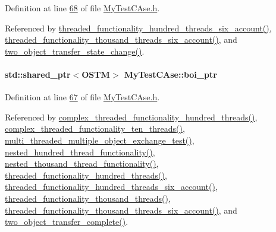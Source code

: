 Definition at line \hyperlink{_my_test_c_ase_8h_source_l00068}{68} of file \hyperlink{_my_test_c_ase_8h_source}{My\+Test\+C\+Ase.\+h}.



Referenced by \hyperlink{_my_test_c_ase_8cpp_source_l00589}{threaded\+\_\+functionality\+\_\+hundred\+\_\+threads\+\_\+six\+\_\+account()}, \hyperlink{_my_test_c_ase_8cpp_source_l00634}{threaded\+\_\+functionality\+\_\+thousand\+\_\+threads\+\_\+six\+\_\+account()}, and \hyperlink{_my_test_c_ase_8cpp_source_l00765}{two\+\_\+object\+\_\+transfer\+\_\+state\+\_\+change()}.

\paragraph[{\texorpdfstring{boi\+\_\+ptr}{boi_ptr}}]{\setlength{\rightskip}{0pt plus 5cm}std\+::shared\+\_\+ptr$<${\bf O\+S\+TM}$>$ My\+Test\+C\+Ase\+::boi\+\_\+ptr}\hypertarget{class_my_test_c_ase_a5554de9e3e6393a89c66c036c529720b_a5554de9e3e6393a89c66c036c529720b}{}\label{class_my_test_c_ase_a5554de9e3e6393a89c66c036c529720b_a5554de9e3e6393a89c66c036c529720b}


Definition at line \hyperlink{_my_test_c_ase_8h_source_l00067}{67} of file \hyperlink{_my_test_c_ase_8h_source}{My\+Test\+C\+Ase.\+h}.



Referenced by \hyperlink{_my_test_c_ase_8cpp_source_l00412}{complex\+\_\+threaded\+\_\+functionality\+\_\+hundred\+\_\+threads()}, \hyperlink{_my_test_c_ase_8cpp_source_l00467}{complex\+\_\+threaded\+\_\+functionality\+\_\+ten\+\_\+threads()}, \hyperlink{_my_test_c_ase_8cpp_source_l00922}{multi\+\_\+threaded\+\_\+multiple\+\_\+object\+\_\+exchange\+\_\+test()}, \hyperlink{_my_test_c_ase_8cpp_source_l00680}{nested\+\_\+hundred\+\_\+thread\+\_\+functionality()}, \hyperlink{_my_test_c_ase_8cpp_source_l00715}{nested\+\_\+thousand\+\_\+thread\+\_\+functionality()}, \hyperlink{_my_test_c_ase_8cpp_source_l00523}{threaded\+\_\+functionality\+\_\+hundred\+\_\+threads()}, \hyperlink{_my_test_c_ase_8cpp_source_l00589}{threaded\+\_\+functionality\+\_\+hundred\+\_\+threads\+\_\+six\+\_\+account()}, \hyperlink{_my_test_c_ase_8cpp_source_l00556}{threaded\+\_\+functionality\+\_\+thousand\+\_\+threads()}, \hyperlink{_my_test_c_ase_8cpp_source_l00634}{threaded\+\_\+functionality\+\_\+thousand\+\_\+threads\+\_\+six\+\_\+account()}, and \hyperlink{_my_test_c_ase_8cpp_source_l00748}{two\+\_\+object\+\_\+transfer\+\_\+complete()}.

